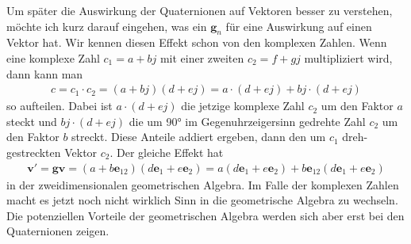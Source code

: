 Um später die Auswirkung der Quaternionen auf Vektoren besser zu verstehen, möchte ich kurz darauf eingehen, was ein  $\mathbf{g}_n$ für eine Auswirkung auf einen Vektor hat.
Wir kennen diesen Effekt schon von den komplexen Zahlen. Wenn eine komplexe Zahl $c_1=a+bj$ mit einer zweiten $c_2=f+gj$ multipliziert wird, dann kann man
\begin{align}
	c = c_1\cdot c_2 = (a + bj)(d + ej) = a\cdot(d+ej) + bj\cdot(d+ej)
\end{align}
so aufteilen. Dabei ist $a\cdot(d+ej)$ die jetzige komplexe Zahl $c_2$ um den Faktor $a$ steckt und $bj\cdot(d+ej)$ die um 90° im Gegenuhrzeigersinn gedrehte Zahl $c_2$ um den Faktor $b$ streckt. Diese Anteile addiert ergeben, dann den um $c_1$ dreh-gestreckten Vektor $c_2$. Der gleiche Effekt hat
\begin{align}\label{GAdrehstreck}
	\mathbf{v}' = \mathbf{g}\mathbf{v} = (a + b\mathbf{e}_{12})(d\mathbf{e}_{1} + e\mathbf{e}_{2}) = a(d\mathbf{e}_{1} + e\mathbf{e}_{2}) + b\mathbf{e}_{12}(d\mathbf{e}_{1} + e\mathbf{e}_{2})
\end{align}
in der zweidimensionalen geometrischen Algebra. Im Falle der komplexen Zahlen macht es jetzt noch nicht wirklich Sinn in die geometrische Algebra zu wechseln. Die potenziellen Vorteile der geometrischen Algebra werden sich aber erst bei den Quaternionen zeigen.